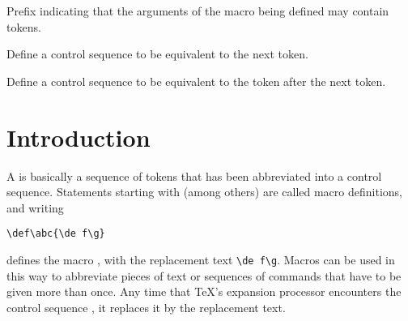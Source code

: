 \documentclass[letterpaper]{book}
\begin{document}
\begin{inventory}
\item [\cs{long}] 
      Prefix indicating that the arguments of the macro being defined
      may contain  tokens.

\item [\cs{let}] 
      Define a control sequence to be equivalent to the next token.

\item [\cs{futurelet}] 
      Define a control sequence to be equivalent to
      the token after the next token.

\end{inventory}

\section{Introduction}

A 
is basically a sequence of tokens that has
been abbreviated into a control sequence.
Statements starting with (among others) 
are called {\italic macro definitions}\alt, and
writing
\begin{verbatim}
\def\abc{\de f\g}
\end{verbatim}
defines the macro ,
with the {\italic replacement text\/} \verb>\de f\g>.
Macros can be used in this way to abbreviate
pieces of text or sequences of commands
that have to be given more than once.
Any time that \TeX's expansion processor
encounters the control sequence ,
it replaces it by the replacement text.
\end{document}
